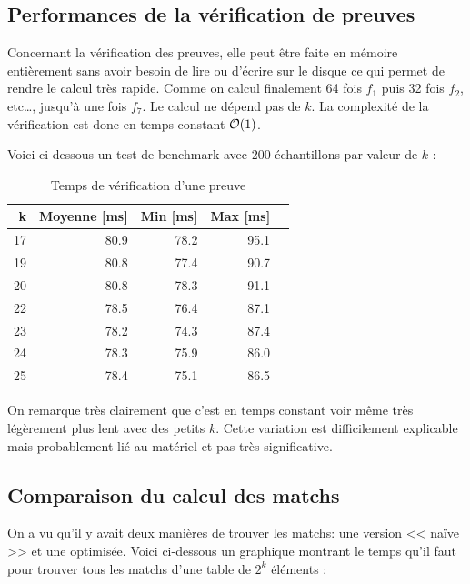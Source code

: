 \subsection{Performances de la vérification de preuves}

Concernant la vérification des preuves, elle peut être faite en mémoire entièrement sans avoir besoin de lire ou d'écrire sur le disque ce qui permet de rendre le calcul très rapide. Comme on calcul finalement 64 fois $f_1$ puis 32 fois $f_2$, etc\dots, jusqu'à une fois $f_7$. Le calcul ne dépend pas de $k$. La complexité de la vérification est donc en temps constant $\mathcal{O}(1)$.

Voici ci-dessous un test de benchmark avec 200 échantillons par valeur de $k$ :

\begin{table}[H]
  \centering
  \begin{tabular}{rrrrr}
    \textbf{k} & \textbf{Moyenne [ms]} & \textbf{Min [ms]} & \textbf{Max [ms]} \\
    \hline
    \hline
    17 & 80.9 & 78.2 & 95.1 \\
    \hline
    19 & 80.8 & 77.4 & 90.7 \\
    \hline
    20 & 80.8 & 78.3 & 91.1 \\
    \hline
    22 & 78.5 & 76.4 & 87.1 \\
    \hline
    23 & 78.2 & 74.3 & 87.4 \\
    \hline
    24 & 78.3 & 75.9 & 86.0 \\
    \hline
    25 & 78.4 & 75.1 & 86.5
  \end{tabular}
  \caption{Temps de vérification d'une preuve}
\end{table}

On remarque très clairement que c'est en temps constant voir même très légèrement plus lent avec des petits $k$. Cette variation est difficilement explicable mais probablement lié au matériel et pas très significative. 

\subsection{Comparaison du calcul des matchs}

On a vu qu'il y avait deux manières de trouver les matchs: une version << naïve >> et une optimisée. Voici ci-dessous un graphique montrant le temps qu'il faut pour trouver tous les matchs d'une table de $2^k$ éléments :

